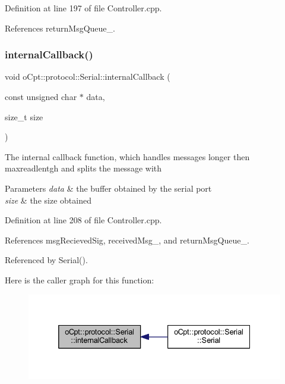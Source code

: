 Definition at line 197 of file Controller.\+cpp.



References return\+Msg\+Queue\+\_\+.

\hypertarget{classo_cpt_1_1protocol_1_1_serial_adb32d1835a99365baa9fb97689e0b664}{}\label{classo_cpt_1_1protocol_1_1_serial_adb32d1835a99365baa9fb97689e0b664} 
\subsubsection{\texorpdfstring{internal\+Callback()}{internalCallback()}}
{\footnotesize\ttfamily void o\+Cpt\+::protocol\+::\+Serial\+::internal\+Callback (\begin{DoxyParamCaption}\item[{const unsigned char $\ast$}]{data,  }\item[{size\+\_\+t}]{size }\end{DoxyParamCaption})\hspace{0.3cm}{\ttfamily [protected]}}

The internal callback function, which handles messages longer then maxreadlentgh and splits the message with ~\newline

\begin{DoxyParams}{Parameters}
{\em data} & the buffer obtained by the serial port \\
\hline
{\em size} & the size obtained \\
\hline
\end{DoxyParams}


Definition at line 208 of file Controller.\+cpp.



References msg\+Recieved\+Sig, received\+Msg\+\_\+, and return\+Msg\+Queue\+\_\+.



Referenced by Serial().

Here is the caller graph for this function\+:\nopagebreak
\begin{figure}[H]
\begin{center}
\leavevmode
\includegraphics[width=332pt]{classo_cpt_1_1protocol_1_1_serial_adb32d1835a99365baa9fb97689e0b664_icgraph}
\end{center}
\end{figure}
\hypertarget{classo_cpt_1_1protocol_1_1_serial_ab63afb811bbfd0da9cba8a4edf8d76fe}{}\label{classo_cpt_1_1protocol_1_1_serial_ab63afb811bbfd0da9cba8a4edf8d76fe} 
